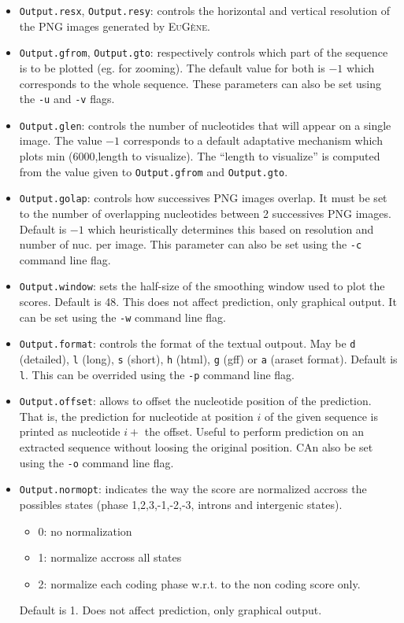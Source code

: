 \documentclass[a4paper,titlepage]{report}
\newcommand{\EuGenie}{\textsc{EuG\`ene}}
\begin{document}
\begin{itemize}
\item \texttt{Output.resx}, \texttt{Output.resy}: controls the
  horizontal and vertical resolution of the PNG images generated by
  \EuGenie. 
  
\item \texttt{Output.gfrom}, \texttt{Output.gto}: respectively
  controls which part of the sequence is to be plotted (eg. for
  zooming). The default value for both is $-1$ which corresponds to
  the whole sequence. These parameters can also be set using the
  \texttt{-u} and \texttt{-v} flags.
  
\item \texttt{Output.glen}: controls the number of nucleotides that
  will appear on a single image. The value $-1$ corresponds to a
  default adaptative mechanism which plots min (6000,length to
  visualize). The ``length to visualize'' is computed from the value
  given to \texttt{Output.gfrom} and \texttt{Output.gto}.
  
\item \texttt{Output.golap}: controls how successives PNG images
  overlap. It must be set to the number of overlapping nucleotides
  between 2 successives PNG images. Default is $-1$ which
  heuristically determines this based on resolution and number of nuc.
  per image. This parameter can also be set using the \texttt{-c}
  command line flag.
  
\item \texttt{Output.window}: sets the half-size of the smoothing
  window used to plot the scores.  Default is 48. This does not affect
  prediction, only graphical output. It can be set using the
  \texttt{-w} command line flag.
  
\item \texttt{Output.format}: controls the format of the textual
  outpout. May be \texttt{d} (detailed), \texttt{l} (long), \texttt{s}
  (short), \texttt{h} (html), \texttt{g} (gff) or \texttt{a} (araset
  format). Default is \texttt{l}. This can be overrided using the
  \texttt{-p} command line flag.
  
\item \texttt{Output.offset}: allows to offset the nucleotide position
  of the prediction.  That is, the prediction for nucleotide at
  position $i$ of the given sequence is printed as nucleotide $i+$ the
  offset. Useful to perform prediction on an extracted sequence
  without loosing the original position. CAn also be set using the
  \texttt{-o} command line flag.
  
\item \texttt{Output.normopt}: indicates the way the score are
  normalized accross the possibles states (phase 1,2,3,-1,-2,-3,
  introns and intergenic states).
  \begin{itemize}
  \item 0: no normalization
  \item 1: normalize accross all states
  \item 2: normalize each coding phase w.r.t. to the non coding
    score only.
  \end{itemize}
  Default is 1. Does not affect prediction, only graphical output.
  

\end{itemize}
\end{document}
